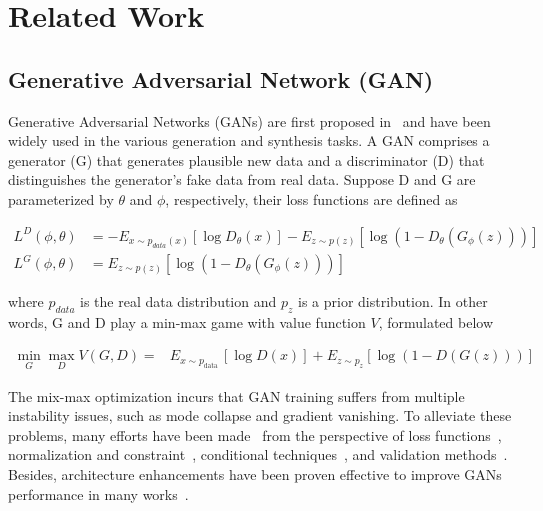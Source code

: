 \documentclass[runningheads]{llncs}
\begin{document}
\section{Related Work}

\subsection{Generative Adversarial Network (GAN)}





Generative Adversarial Networks (GANs) are first proposed in~\cite{goodfellow2014generative} and have been widely used in the various generation and synthesis tasks. A GAN comprises a generator (G) that generates plausible new data and a discriminator (D) that distinguishes the generator's fake data from real data. Suppose D and G are parameterized by $\theta$ and $\phi$, respectively, their loss functions are defined as 



\begin{align}
L^D(\phi,\theta) &= -E_{x \sim p_{data}(x)}[\log D_{\theta}(x)] - E_{z \sim p(z)} [\log (1-D_{\theta}(G_{\phi}(z)))] \label{eq:D_loss}\\
L^G(\phi,\theta) &= E_{z \sim p(z)} [\log (1-D_{\theta}(G_{\phi}(z)))] \label{eq:G_loss}
\end{align}

\noindent where $p_{data}$ is the real data distribution and $p_z$ is a prior distribution. In other words, G and D play a min-max game with value function $V$, formulated below

\begin{align}
\min _{G} \max _{D} V(G, D)=& E_{x \sim p_{\text {data }}}[\log D(x)] +E_{z \sim p_{z}}[\log (1-D(G(z)))]
\label{eq:GAN}
\end{align}

\noindent The mix-max optimization incurs that GAN training suffers from multiple instability issues, such as mode collapse and gradient vanishing. To alleviate these problems, many efforts have been made~\cite{bissoto2019six} from the perspective of loss functions~\cite{wgan,improving_mmd_gan,bsgan}, normalization and constraint~\cite{wgan-gp,SNGAN}, conditional techniques~\cite{acgan,stylegan}, and validation methods~\cite{IS,FID}. Besides, architecture enhancements have been proven effective to improve GANs performance in many works~\cite{dcgan,biggan,progressiveGAN}.
\end{document}
